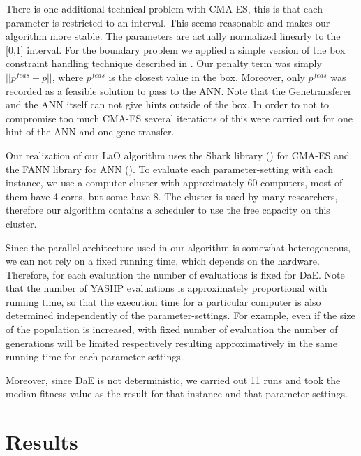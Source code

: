 \documentclass{MYsig-alternate}
\begin{document}
There is one additional technical problem with CMA-ES, this is that each parameter is restricted to an interval. This seems reasonable and makes our algorithm more stable. The parameters are actually normalized linearly to the [0,1] interval. For the boundary problem we applied a simple version of the box constraint handling technique described in \cite{hansen2009tec}. Our penalty term was simply \begin{math}||p^{feas}-p|| \end{math}, where \begin{math}p^{feas}\end{math} is the closest value in the box. Moreover, only \begin{math}p^{feas}\end{math} was recorded as a feasible solution to pass to the ANN. Note that the Genetransferer and the ANN itself can not give hints outside of the box. In order to not to compromise too much CMA-ES several iterations of this were carried out for one hint of the ANN and one gene-transfer.

Our realization of our LaO algorithm uses the Shark library (\cite{shark08}) for CMA-ES and the FANN library for ANN (\cite{nissen}). To evaluate each parameter-setting with each instance, we use a computer-cluster with approximately 60 computers, most of them have 4 cores, but some have 8. The cluster is used by many researchers, therefore our algorithm contains a scheduler to use the free capacity on this cluster.

Since the parallel architecture used in our algorithm is somewhat heterogeneous, we can not rely on a fixed running time, which depends on the hardware. Therefore, for each evaluation the number of evaluations is fixed for DaE. Note that the number of YASHP evaluations is approximately proportional with running time, so that the execution time for a particular computer is also determined independently of the parameter-settings. For example, even if the size of the population is increased, with fixed number of evaluation the number of generations will be limited respectively resulting approximatively in the same running time for each parameter-settings. 

Moreover, since DaE is not deterministic, we carried out 11 runs and took the median fitness-value as the result for that instance and that parameter-settings.

\section{Results}
\label{section:results}
\end{document}
